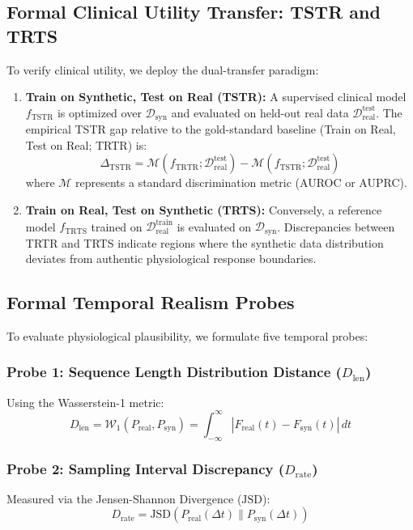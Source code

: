 \documentclass[journal]{IEEEtran}
\begin{document}
\subsection{Formal Clinical Utility Transfer: TSTR and TRTS}
To verify clinical utility, we deploy the dual-transfer paradigm:
\begin{enumerate}
    \item \textbf{Train on Synthetic, Test on Real (TSTR):}
    A supervised clinical model $f_{\text{TSTR}}$ is optimized over $\mathcal{D}_{\text{syn}}$ and evaluated on held-out real data $\mathcal{D}_{\text{real}}^{\text{test}}$. The empirical TSTR gap relative to the gold-standard baseline (Train on Real, Test on Real; TRTR) is:
    \begin{equation}
    \Delta_{\text{TSTR}} = \mathcal{M}(f_{\text{TRTR}}; \mathcal{D}_{\text{real}}^{\text{test}}) - \mathcal{M}(f_{\text{TSTR}}; \mathcal{D}_{\text{real}}^{\text{test}})
    \end{equation}
    where $\mathcal{M}$ represents a standard discrimination metric (AUROC or AUPRC).
    \item \textbf{Train on Real, Test on Synthetic (TRTS):}
    Conversely, a reference model $f_{\text{TRTS}}$ trained on $\mathcal{D}_{\text{real}}^{\text{train}}$ is evaluated on $\mathcal{D}_{\text{syn}}$. Discrepancies between TRTR and TRTS indicate regions where the synthetic data distribution deviates from authentic physiological response boundaries.
\end{enumerate}

\subsection{Formal Temporal Realism Probes}
To evaluate physiological plausibility, we formulate five temporal probes:

\subsubsection{Probe 1: Sequence Length Distribution Distance ($D_{\text{len}}$)}
Using the Wasserstein-1 metric:
\begin{equation}
D_{\text{len}} = \mathcal{W}_1(P_{\text{real}}, P_{\text{syn}}) = \int_{-\infty}^\infty |F_{\text{real}}(t) - F_{\text{syn}}(t)| \, dt
\end{equation}

\subsubsection{Probe 2: Sampling Interval Discrepancy ($D_{\text{rate}}$)}
Measured via the Jensen-Shannon Divergence ($\text{JSD}$):
\begin{equation}
D_{\text{rate}} = \text{JSD}(P_{\text{real}}(\Delta t) \parallel P_{\text{syn}}(\Delta t))
\end{equation}
\end{document}
